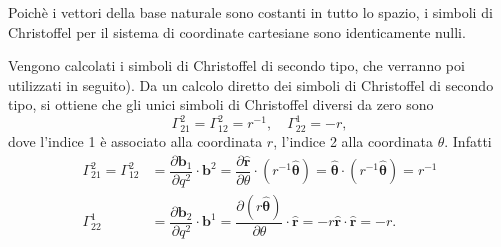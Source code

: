 \begin{example}
 Poichè i vettori della base naturale sono costanti in tutto lo spazio, i simboli di Christoffel per il sistema di coordinate cartesiane sono identicamente nulli.
\end{example}
\begin{example}
 Vengono calcolati i simboli di Christoffel di secondo tipo, che verranno poi utilizzati in seguito). Da un calcolo diretto dei simboli di Christoffel di secondo tipo, si ottiene che gli unici simboli di Christoffel diversi da zero sono
\begin{equation}
 \Gamma^2_{21} = \Gamma^2_{12} = r^{-1} , \quad \Gamma^1_{22} = - r ,
\end{equation}
dove l'indice 1 è associato alla coordinata $r$, l'indice 2 alla coordinata $\theta$. Infatti
\begin{equation}
\begin{aligned}
 \Gamma_{21}^2 = \Gamma_{12}^2  & = \dfrac{\partial \bm{b}_1}{\partial q^2} \cdot \bm{b}^2 = \dfrac{\partial \bm{\hat{r}}}{\partial \theta} \cdot( r^{-1} \bm{\hat{\theta}} ) = \bm{\hat{\theta}} \cdot (r^{-1} \bm{\hat{\theta}}) = r^{-1} \\
 \Gamma_{22}^1  & = \dfrac{\partial \bm{b}_2}{\partial q^2} \cdot \bm{b}^1 = \dfrac{\partial (r \bm{\hat{\theta}})}{\partial \theta} \cdot \bm{\hat{r}} = - r \bm{\hat{r}} \cdot \bm{\hat{r}} = - r . \\
\end{aligned}
\end{equation}
\end{example}

